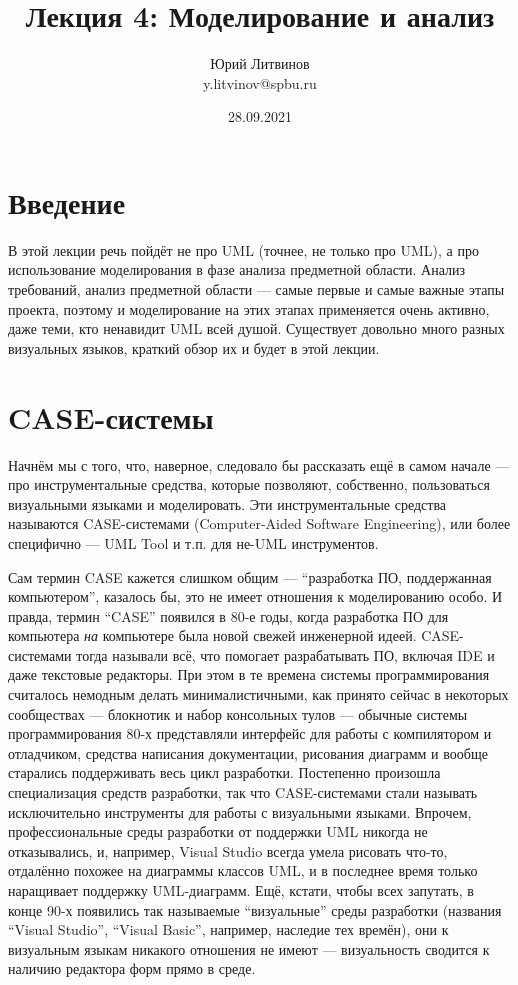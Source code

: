\documentclass[a5paper]{article}
\title{Лекция 4:  Моделирование и анализ}
\author{Юрий Литвинов\\\small{y.litvinov@spbu.ru}}
\date{28.09.2021}
\begin{document}
\maketitle
\thispagestyle{empty}

\section{Введение}

В этой лекции речь пойдёт не про UML (точнее, не только про UML), а про использование моделирования в фазе анализа предметной области. Анализ требований, анализ предметной области --- самые первые и самые важные этапы проекта, поэтому и моделирование на этих этапах применяется очень активно, даже теми, кто ненавидит UML всей душой. Существует довольно много разных визуальных языков, краткий обзор их и будет в этой лекции.

\section{CASE-системы}

Начнём мы с того, что, наверное, следовало бы рассказать ещё в самом начале --- про инструментальные средства, которые позволяют, собственно, пользоваться визуальными языками и моделировать. Эти инструментальные средства называются CASE-системами (Computer-Aided Software Engineering), или более специфично --- UML Tool и т.п. для не-UML инструментов. 

Сам термин CASE кажется слишком общим --- ``разработка ПО, поддержанная компьютером'', казалось бы, это не имеет отношения к моделированию особо. И правда, термин ``CASE'' появился в 80-е годы, когда разработка ПО для компьютера \textit{на} компьютере была новой свежей инженерной идеей. CASE-системами тогда называли всё, что помогает разрабатывать ПО, включая IDE и даже текстовые редакторы. При этом в те времена системы программирования считалось немодным делать минималистичными, как принято сейчас в некоторых сообществах --- блокнотик и набор консольных тулов --- обычные системы программирования 80-х представляли интерфейс для работы с компилятором и отладчиком, средства написания документации, рисования диаграмм и вообще старались поддерживать весь цикл разработки. Постепенно произошла специализация средств разработки, так что CASE-системами стали называть исключительно инструменты для работы с визуальными языками. Впрочем, профессиональные среды разработки от поддержки UML никогда не отказывались, и, например, Visual Studio всегда умела рисовать что-то, отдалённо похожее на диаграммы классов UML, и в последнее время только наращивает поддержку UML-диаграмм. Ещё, кстати, чтобы всех запутать, в конце 90-х появились так называемые ``визуальные'' среды разработки (названия ``Visual Studio'', ``Visual Basic'', например, наследие тех времён), они к визуальным языкам никакого отношения не имеют --- визуальность сводится к наличию редактора форм прямо в среде.
\end{document}
